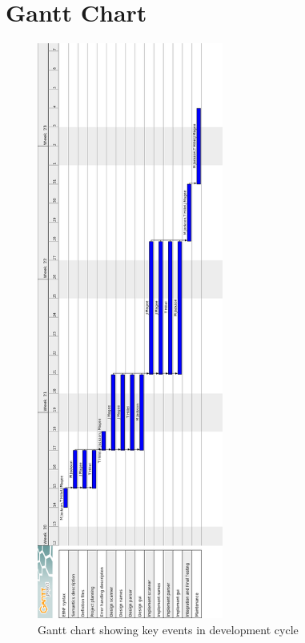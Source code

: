\documentclass[a4paper,10pt]{article}
\begin{document}
\section{Gantt Chart}
\begin{figure}[h]
 \centering
  \includegraphics[height=19cm]{Gantt-Chart.png}
 \caption{Gantt chart showing key events in development cycle}
 \label{fig:ganttchart}
\end{figure}
\pagebreak
\end{document}
